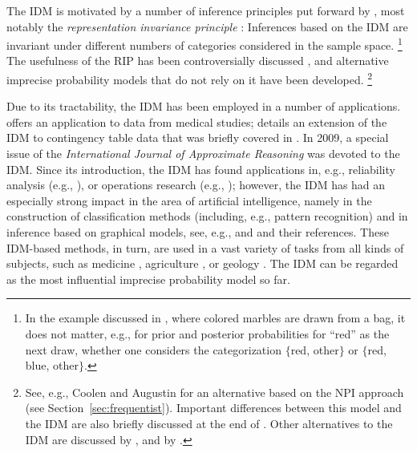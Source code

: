The IDM is motivated by a number of inference principles put forward by \textcite[\S 1]{1996:walley::idm},
most notably the \emph{representation invariance principle} \parencite[RIP, see][\S 2.9]{1996:walley::idm}:
Inferences based on the IDM are invariant under different numbers of categories considered in the sample space.%
\footnote{In the example discussed in \textcite{1996:walley::idm},
where colored marbles are drawn from a bag,
it does not matter, e.g., for prior and posterior probabilities for ``red'' as the next draw,
whether one considers the categorization $\{$red, other$\}$ or $\{$red, blue, other$\}$.}
The usefulness of the RIP has been controversially discussed \parencite[see, e.g., the discussion to][]{1996:walley::idm},
and alternative imprecise probability models that do not rely on it have been developed.%
\footnote{See, e.g., Coolen and Augustin \parencite*{2005:Coolen:Augustin, 2009:Coolen:Augustin}
for an alternative based on the NPI approach (see Section~\ref{sec:frequentist}). %
Important differences between this model and the IDM are also briefly discussed at the end of \textcite[\S 6.1]{itip-statinf}.
Other alternatives to the IDM are discussed by \textcite[see Section~\ref{sec:alternatives:conjugate}]{2009:bickis},
and by \textcite{2013:mangilibenavoli}.}



Due to its tractability, the IDM has been employed in a number of applications.
\textcite{1996:walley::idm} offers an application to data from medical studies;
\textcite{2005:bernard} details an extension of the IDM to contingency table data that was briefly covered in \textcite{1996:walley::idm}.
In 2009, a special issue of the \emph{International Journal of Approximate Reasoning} \parencite{2009:bernard} was devoted to the IDM.
Since its introduction, the IDM has found applications in, e.g.,
reliability analysis (e.g., \cite{1997:Coolen, 2010:utkin:kozine, 2010:utkin:zatenko:coolen, 2011:li:chen:yi:tao}),
or operations research (e.g., \cite{2006:utkin::expertjudgements});
however, the IDM has had an especially strong impact in the area of artificial intelligence,
namely in the construction of classification methods (including, e.g., pattern recognition) and in inference based on graphical models,
see, e.g., \textcite{itip-classification} and \textcite{itip-ipgms} and their references.
These IDM-based methods, in turn, are used in a vast variety of tasks from all kinds of subjects,
such as medicine \parencite[e.g.,][]{2003:zaffalon::dementia},
agriculture \parencite[e.g.,][]{2005:zaffalon::environment},
or geology \parencite[e.g.,][]{2007:antonucci}.
The IDM can be regarded as the most influential imprecise probability model so far.

